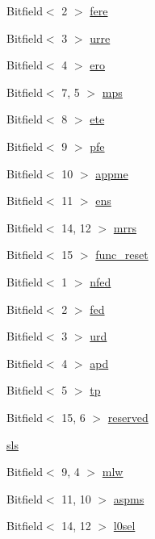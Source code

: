 \begin{DoxyCompactItemize}
\item 
Bitfield$<$ 2 $>$ \hyperlink{structPXCAP_a2d36e3b99f1718b1bca55d9a05c0a86a}{fere}
\item 
Bitfield$<$ 3 $>$ \hyperlink{structPXCAP_ab021ab93a2f4150f7a02c471dd3f3ae8}{urre}
\item 
Bitfield$<$ 4 $>$ \hyperlink{structPXCAP_ad8872d54a6c8bb520053a266d977a5cb}{ero}
\item 
Bitfield$<$ 7, 5 $>$ \hyperlink{structPXCAP_a11dd68eae2e88019fef8141208baa440}{mps}
\item 
Bitfield$<$ 8 $>$ \hyperlink{structPXCAP_a79a770cdf8225a7a35bfa7489cf5c5ab}{ete}
\item 
Bitfield$<$ 9 $>$ \hyperlink{structPXCAP_a72d535039f4ed541f23907a43900a949}{pfe}
\item 
Bitfield$<$ 10 $>$ \hyperlink{structPXCAP_a625b6143578dce8ca730abd80ec3301b}{appme}
\item 
Bitfield$<$ 11 $>$ \hyperlink{structPXCAP_a4508f9cdaabf2476312bf21ec0406733}{ens}
\item 
Bitfield$<$ 14, 12 $>$ \hyperlink{structPXCAP_af4bbae3ed61f59983f074b7c436d5890}{mrrs}
\item 
Bitfield$<$ 15 $>$ \hyperlink{structPXCAP_a46e6fbf6b0f817c753fb5cd7b2ae1221}{func\_\-reset}
\item 
Bitfield$<$ 1 $>$ \hyperlink{structPXCAP_a37cd76a12dcef67b2b912e7e6c2a56a1}{nfed}
\item 
Bitfield$<$ 2 $>$ \hyperlink{structPXCAP_a035ec313d7781a4f83d0d7b539786d9e}{fed}
\item 
Bitfield$<$ 3 $>$ \hyperlink{structPXCAP_a8e0e3f70b67ebf200891174583e18e97}{urd}
\item 
Bitfield$<$ 4 $>$ \hyperlink{structPXCAP_a92827cee23d5b11f20c240c9912c0fe5}{apd}
\item 
Bitfield$<$ 5 $>$ \hyperlink{structPXCAP_a0a8076923ce853476a1490c0dfde2337}{tp}
\item 
Bitfield$<$ 15, 6 $>$ \hyperlink{structPXCAP_a2dacf33c56d59b4d707c8af7f18ab5d2}{reserved}
\item 
\hyperlink{structPXCAP_aab4987c3d72187843529363c94243750}{sls}
\item 
Bitfield$<$ 9, 4 $>$ \hyperlink{structPXCAP_ae204d8e4acec20de72d7b44e78e934a7}{mlw}
\item 
Bitfield$<$ 11, 10 $>$ \hyperlink{structPXCAP_a31582bb700bfd751c22c2859a06d762c}{aspms}
\item 
Bitfield$<$ 14, 12 $>$ \hyperlink{structPXCAP_a42faf01136234b2b33b7c74fd019a0fd}{l0sel}
\item 

\end{DoxyCompactItemize}
